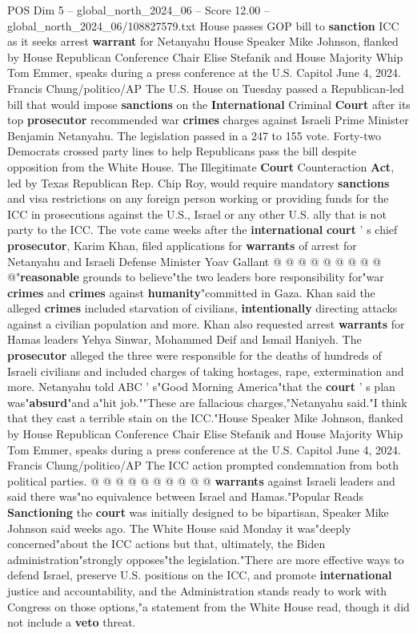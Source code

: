 \begin{textsample}{POS Dim 5 – global\_north\_2024\_06 – Score 12.00 – global\_north\_2024\_06/108827579.txt}  \label{ex:f5_pos_375}
House passes GOP bill to \textbf{sanction} ICC as it seeks arrest \textbf{warrant} for Netanyahu House Speaker Mike Johnson, flanked by House Republican Conference Chair Elise Stefanik and House Majority Whip Tom Emmer, speaks during a press conference at the U.S.
Capitol June 4, 2024.
Francis Chung/politico/AP The U.S.
House on Tuesday passed a Republican-led bill that would impose \textbf{sanctions} on the \textbf{International} Criminal \textbf{Court} after its top \textbf{prosecutor} recommended war \textbf{crimes} charges against Israeli Prime Minister Benjamin Netanyahu.
The legislation passed in a 247 to 155 vote.
Forty-two Democrats crossed party lines to help Republicans pass the bill despite opposition from the White House.
The Illegitimate \textbf{Court} Counteraction \textbf{Act}, led by Texas Republican Rep.
Chip Roy, would require mandatory \textbf{sanctions} and visa restrictions on any foreign person working or providing funds for the ICC in prosecutions against the U.S., Israel or any other U.S. ally that is not party to the ICC.
The vote came weeks after the \textbf{international} \textbf{court} ' s chief \textbf{prosecutor}, Karim Khan, filed applications for \textbf{warrants} of arrest for Netanyahu and Israeli Defense Minister Yoav Gallant @ @ @ @ @ @ @ @ @ @"\textbf{reasonable} grounds to believe"the two leaders bore responsibility for"war \textbf{crimes} and \textbf{crimes} against \textbf{humanity}"committed in Gaza.
Khan said the alleged \textbf{crimes} included starvation of civilians, \textbf{intentionally} directing attacks against a civilian population and more.
Khan also requested arrest \textbf{warrants} for Hamas leaders Yehya Sinwar, Mohammed Deif and Ismail Haniyeh.
The \textbf{prosecutor} alleged the three were responsible for the deaths of hundreds of Israeli civilians and included charges of taking hostages, rape, extermination and more.
Netanyahu told ABC ' s"Good Morning America"that the \textbf{court} ' s plan was"\textbf{absurd}"and a"hit job.""These are fallacious charges,"Netanyahu said."I think that they cast a terrible stain on the ICC."House Speaker Mike Johnson, flanked by House Republican Conference Chair Elise Stefanik and House Majority Whip Tom Emmer, speaks during a press conference at the U.S.
Capitol June 4, 2024.
Francis Chung/politico/AP The ICC action prompted condemnation from both political parties. @ @ @ @ @ @ @ @ @ @ \textbf{warrants} against Israeli leaders and said there was"no equivalence between Israel and Hamas."Popular Reads \textbf{Sanctioning} the \textbf{court} was initially designed to be bipartisan, Speaker Mike Johnson said weeks ago.
The White House said Monday it was"deeply concerned"about the ICC actions but that, ultimately, the Biden administration"strongly opposes"the legislation."There are more effective ways to defend Israel, preserve U.S. positions on the ICC, and promote \textbf{international} justice and accountability, and the Administration stands ready to work with Congress on those options,"a statement from the White House read, though it did not include a \textbf{veto} threat.


\end{textsample}
